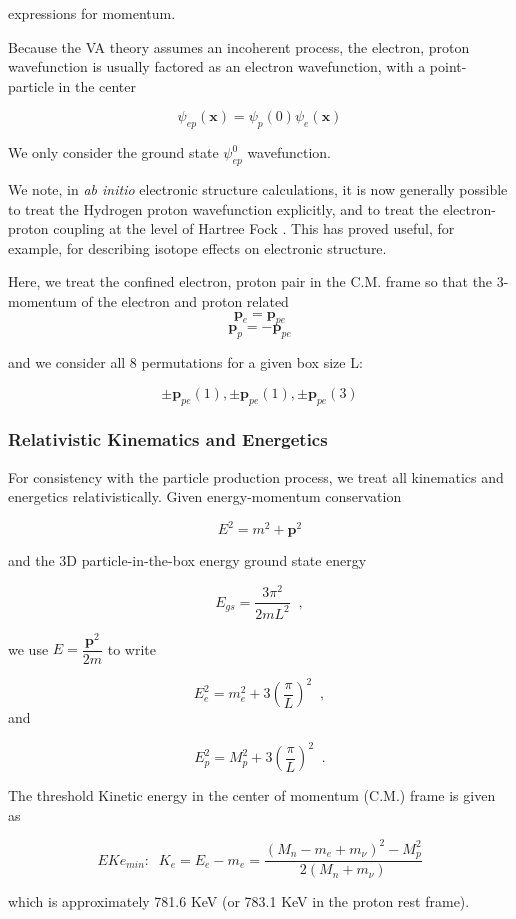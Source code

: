 \documentclass[%
 aip,
 jmp,%
 amsmath,amssymb,
 reprint,%
]{revtex4-1}
\begin{document}
expressions for momentum.

Because the VA theory assumes an incoherent process, the electron, proton wavefunction is usually factored as an electron wavefunction, with a point-particle in the center

$$\psi_{ep}(\mathbf{x})=\psi_{p}(0)\psi_{e}(\mathbf{x})$$

We only consider the ground state $\psi_{ep}^{0}$ wavefunction.

We note, in \emph{ab initio} electronic structure calculations, it is now generally possible to treat the Hydrogen proton wavefunction explicitly, and to treat the electron-proton coupling at the level of Hartree Fock \cite{martin}.  This has proved useful, for example, for describing isotope effects on electronic structure.

Here, we treat the confined electron, proton pair in the C.M. frame so that the 3-momentum of the electron and proton related
$$\mathbf{p}_{e}=\mathbf{p}_{pe}$$
$$\mathbf{p}_{p}=-\mathbf{p}_{pe}$$

and we consider all 8 permutations for a given box size L:

$$\pm\mathbf{p}_{pe}(1), \pm\mathbf{p}_{pe}(1), \pm\mathbf{p}_{pe}(3)$$

\subsubsection{Relativistic Kinematics and Energetics}
For consistency with the particle production process, we treat all kinematics and energetics relativistically.  Given energy-momentum conservation

$$E^{2}=m^{2}+\mathbf{p}^{2}$$

and the 3D particle-in-the-box energy ground state energy 

$$E_{gs}=\dfrac{3\pi^{2}}{2mL^{2}}\;\;,$$

we use $E=\dfrac{\mathbf{p}^{2}}{2m}$ to write

$$E^{2}_{e}=m^{2}_{e}+3\left(\dfrac{\pi}{L}\right)^{2}\;\;,$$ and

$$E^{2}_{p}=M^{2}_{p}+3\left(\dfrac{\pi}{L}\right)^{2}\;\;.$$

The threshold Kinetic energy in the center of momentum (C.M.) frame is given as

$$EKe_{min}:\;\;K_{e}=E_{e}-m_{e}=\dfrac{(M_{n}-m_{e}+m_{\nu})^{2}-M^{2}_{p}}{2(M_{n}+m_{\nu})}$$

which is approximately 781.6 KeV (or 783.1 KeV in the proton rest frame).
\end{document}
